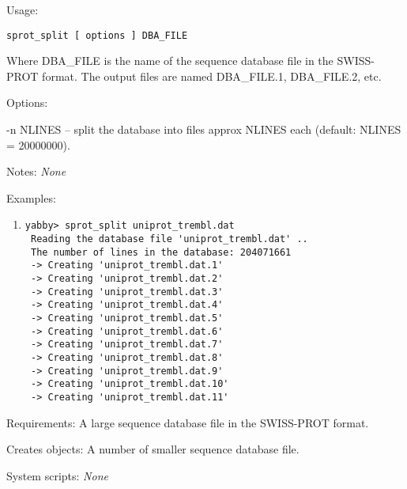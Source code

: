 \begin{description}


\item{Usage:}

{\tt sprot\_split [ options ] DBA\_FILE}

 Where DBA\_FILE is the name of the sequence database file in
 the SWISS-PROT format. The output files are named DBA\_FILE.1,
 DBA\_FILE.2, etc.


\item{Options:}
\begin{description}
\item -n NLINES -- split the database into files approx NLINES
 each (default: NLINES = 20000000).
\end{description}


\item{Notes:} {\em None}


\item{Examples:}
\begin{enumerate}

\item
\begin{verbatim}
yabby> sprot_split uniprot_trembl.dat
 Reading the database file 'uniprot_trembl.dat' ..
 The number of lines in the database: 204071661
 -> Creating 'uniprot_trembl.dat.1'
 -> Creating 'uniprot_trembl.dat.2'
 -> Creating 'uniprot_trembl.dat.3'
 -> Creating 'uniprot_trembl.dat.4'
 -> Creating 'uniprot_trembl.dat.5'
 -> Creating 'uniprot_trembl.dat.6'
 -> Creating 'uniprot_trembl.dat.7'
 -> Creating 'uniprot_trembl.dat.8'
 -> Creating 'uniprot_trembl.dat.9'
 -> Creating 'uniprot_trembl.dat.10'
 -> Creating 'uniprot_trembl.dat.11'

\end{verbatim}

\end{enumerate}


\item{Requirements:} A large sequence database file in the SWISS-PROT format.


\item{Creates objects:} A number of smaller sequence database file.


\item{System scripts:} {\em None}

\end{description}


